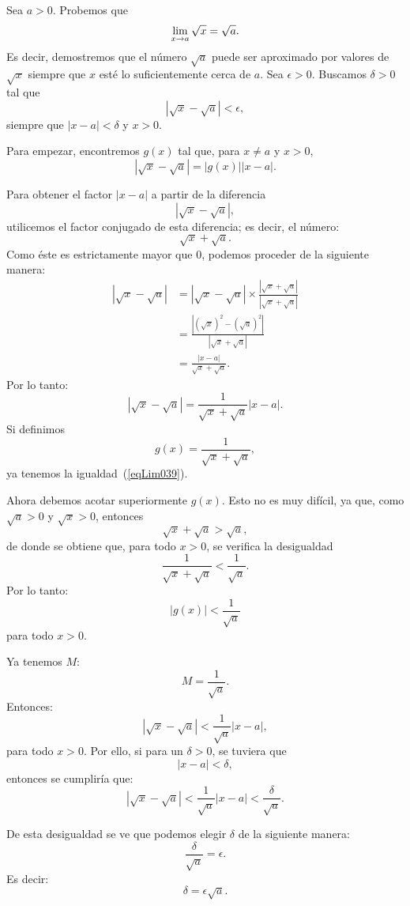 \begin{exemplo}[Solución]{Sea $a > 0$. Probemos que
\[
\limjc{\sqrt{x}}{x}{a} = \sqrt{a}.
\]
Es decir, demostremos que el número $\sqrt{a}$ puede ser aproximado por valores de $\sqrt{x}$
siempre que $x$ esté lo suficientemente cerca de $a$.} Sea $\epsilon > 0$. Buscamos $\delta > 0$
tal que
\[
|\sqrt{x} - \sqrt{a}| < \epsilon,
\]
siempre que $|x - a| < \delta$ y $x > 0$.

Para empezar, encontremos $g(x)$ tal que, para $x\neq a$ y $x > 0$,
\begin{equation}
\label{eqLim039}
|\sqrt{x} - \sqrt{a}| = |g(x)||x - a|.
\end{equation}

Para obtener el factor $|x - a|$ a partir de la diferencia
\[
|\sqrt{x} - \sqrt{a}|,
\]
utilicemos el factor conjugado de esta diferencia; es decir, el número:
\[
\sqrt{x} + \sqrt{a}.
\]
Como éste es estrictamente mayor que $0$, podemos proceder de la siguiente manera:
\begin{align*}
|\sqrt{x} - \sqrt{a}| &=
|\sqrt{x} - \sqrt{a}|\times\frac{|\sqrt{x} + \sqrt{a}|}{|\sqrt{x} + \sqrt{a}|} \\
&= \frac{|(\sqrt{x})^2 - (\sqrt{a})^2|}{|\sqrt{x} + \sqrt{a}|} \\
&= \frac{|x - a|}{\sqrt{x} + \sqrt{a}}.
\end{align*}
Por lo tanto:
\begin{equation}
\label{eqLim038}
|\sqrt{x} - \sqrt{a}| = \frac{1}{\sqrt{x} + \sqrt{a}}|x - a|.
\end{equation}
Si definimos
\[
g(x) = \frac{1}{\sqrt{x} + \sqrt{a}},
\]
ya tenemos la igualdad~(\ref{eqLim039}).

Ahora debemos acotar superiormente $g(x)$. Esto no es muy difícil, ya que, como $\sqrt{a} > 0$ y
$\sqrt{x} > 0$, entonces
\[
\sqrt{x} + \sqrt{a} > \sqrt{a},
\]
de donde se obtiene que, para todo $x > 0$, se verifica la desigualdad
\[
\frac{1}{\sqrt{x} + \sqrt{a}} < \frac{1}{\sqrt{a}}.
\]
Por lo tanto:
\[
|g(x)| < \frac{1}{\sqrt{a}}
\]
para todo $x > 0$.

Ya tenemos $M$:
\[
M = \frac{1}{\sqrt{a}}.
\]
Entonces:
\[
|\sqrt{x} - \sqrt{a}| < \frac{1}{\sqrt{a}}|x - a|,
\]
para todo $x > 0$. Por ello, si para un $\delta > 0$, se tuviera que
\[
|x - a| < \delta,
\]
entonces se cumpliría que:
\[
|\sqrt{x} - \sqrt{a}| < \frac{1}{\sqrt{a}}|x - a| < \frac{\delta}{\sqrt{a}}.
\]

De esta desigualdad se ve que podemos elegir $\delta$ de la siguiente manera:
\[
\frac{\delta}{\sqrt{a}} = \epsilon.
\]
Es decir:
\[
\delta = \epsilon\sqrt{a}.
\]


\end{exemplo}
